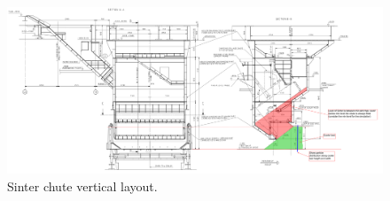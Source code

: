 \begin{figure}[!htb]
\centering
\includegraphics[width=.80\columnwidth]{images/055sinterChuteVerticalLayout}
\caption[Sinter chute vertical layout]{Sinter chute vertical layout.}
\label{fig:055sinterChuteVerticalLayout}
\end{figure}